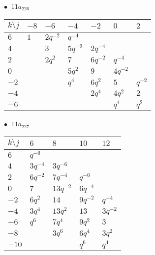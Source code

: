 \begin{minipage}{\linewidth}
$\bullet\ $ $11a_{226}$ \vspace{0.5em} \\
\begin{tabular}{l|llllll}
$k \setminus j$ & $-8$ & $-6$ & $-4$ & $-2$ & $0$ & $2$ \\
\hline
$6$ & $1$ & $2q^{-2}$ & $q^{-4}$ &  &  &  \\
$4$ &  & $3$ & $5q^{-2}$ & $2q^{-4}$ &  &  \\
$2$ &  & $2q^{2}$ & $7$ & $6q^{-2}$ & $q^{-4}$ &  \\
$0$ &  &  & $5q^{2}$ & $9$ & $4q^{-2}$ &  \\
$-2$ &  &  & $q^{4}$ & $6q^{2}$ & $5$ & $q^{-2}$ \\
$-4$ &  &  &  & $2q^{4}$ & $4q^{2}$ & $2$ \\
$-6$ &  &  &  &  & $q^{4}$ & $q^{2}$ \\
\end{tabular}
\vspace{2em}
\end{minipage}
%
\begin{minipage}{\linewidth}
$\bullet\ $ $11a_{227}$ \vspace{0.5em} \\
\begin{tabular}{l|llll}
$k \setminus j$ & $6$ & $8$ & $10$ & $12$ \\
\hline
$6$ & $q^{-6}$ &  &  &  \\
$4$ & $3q^{-4}$ & $3q^{-6}$ &  &  \\
$2$ & $6q^{-2}$ & $7q^{-4}$ & $q^{-6}$ &  \\
$0$ & $7$ & $13q^{-2}$ & $6q^{-4}$ &  \\
$-2$ & $6q^{2}$ & $14$ & $9q^{-2}$ & $q^{-4}$ \\
$-4$ & $3q^{4}$ & $13q^{2}$ & $13$ & $3q^{-2}$ \\
$-6$ & $q^{6}$ & $7q^{4}$ & $9q^{2}$ & $3$ \\
$-8$ &  & $3q^{6}$ & $6q^{4}$ & $3q^{2}$ \\
$-10$ &  &  & $q^{6}$ & $q^{4}$ \\
\end{tabular}
\vspace{2em}
\end{minipage}
%
